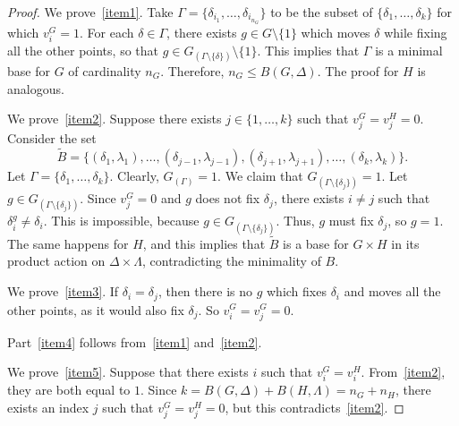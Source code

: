 \documentclass{amsart}
\begin{document}
	\begin{proof}
	We prove~\eqref{item1}.	 Take $\Gamma = \{\delta_{i_1},\dots,\delta_{i_{n_G}}\}$ to be the subset of $\{\delta_1, \dots, \delta_k\}$  for which $v^G_i=1$. For each $\delta \in \Gamma$, there exists $g\in G \setminus \{1\}$ which moves $\delta$ while fixing all the other points, so that $g \in G_{(\Gamma \setminus \{\delta\})}\setminus \{1\}$. This implies that $\Gamma$ is a minimal base for $G$ of cardinality $n_G$. Therefore, $n_G \leq B(G,\Delta)$. The proof for $H$ is analogous. 
	
  We prove~\eqref{item2}.			 Suppose there exists $j \in \{1,\dots,k\}$ such that $v^G_j = v^H_j = 0$. Consider the set
			\[
				\tilde{B}=\{(\delta_1,\lambda_1),\dots,(\delta_{j-1},\lambda_{j-1}),(\delta_{j+1},\lambda_{j+1}),\dots,(\delta_k,\lambda_k)\}.
			\]
			Let $\Gamma = \{\delta_1,\dots,\delta_k\}$. Clearly, $G_{(\Gamma)} = 1$. We claim that $G_{(\Gamma\setminus \{\delta_j\})} = 1$. Let $g \in G_{(\Gamma\setminus \{\delta_j\})}$. Since $v^G_j = 0$ and  $g$ does not fix $\delta_j$, there exists $i\neq j$ such that $\delta_i^g \neq \delta_i$. This is impossible, because $g \in G_{(\Gamma \setminus \{\delta_j\})}$. Thus, $g$ must fix $\delta_j$, so  $g=1$. The same happens for $H$, and this implies that $\tilde{B}$ is a base for $G \times H$ in its product action on $\Delta\times \Lambda$, contradicting the minimality of $B$.
			
			We prove~\eqref{item3}. If $\delta_i=\delta_j$, then there is no $g$ which fixes $\delta_i$ and moves all the other points, as it would also fix  $\delta_j$. So $v^G_i = v^G_j = 0$.
			
			Part~\eqref{item4} follows from~\eqref{item1} and~\eqref{item2}.  
			
			We prove~\eqref{item5}.  Suppose that there exists $i$ such that $v^G_i = v^H_i$. From~\eqref{item2}, they are both equal to $1$. Since $k = B(G,\Delta) + B(H,\Lambda) = n_G + n_H$, there exists an index $j$ such that $v^G_j = v^H_j = 0$, but this contradicts~\eqref{item2}.
	\end{proof}
\end{document}

